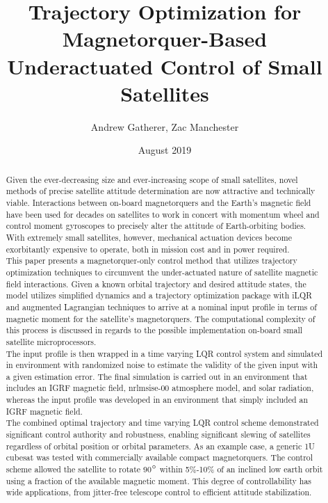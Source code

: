 \documentclass{article}
\begin{document}
\title{Trajectory Optimization for Magnetorquer-Based Underactuated Control of Small Satellites}
\author{Andrew Gatherer, Zac Manchester}
\date{August 2019}
\maketitle

\begin{abstract}
Given the ever-decreasing size and ever-increasing scope of small satellites, novel methods of precise satellite attitude determination are now attractive and technically viable. Interactions between on-board magnetorquers and the Earth's magnetic field have been used for decades on satellites to work in concert with momentum wheel and control moment gyroscopes to precisely alter the attitude of Earth-orbiting bodies. With extremely small satellites, however, mechanical actuation devices become exorbitantly expensive to operate, both in mission cost and in power required. \\
\indent This paper presents a magnetorquer-only control method that utilizes trajectory optimization techniques to circumvent the under-actuated nature of satellite magnetic field interactions. Given a known orbital trajectory and desired attitude states, the model utilizes simplified dynamics and a trajectory optimization package with iLQR and augmented Lagrangian techniques to arrive at a nominal input profile in terms of magnetic moment for the satellite's magnetorquers. The computational complexity of this process is discussed in regards to the possible implementation on-board small satellite microprocessors. \\
\indent The input profile is then wrapped in a time varying LQR control system and simulated in environment with randomized noise to estimate the validity of the given input with a given estimation error. The final simulation is carried out in an environment that includes an IGRF magnetic field, nrlmsise-00 atmosphere model, and solar radiation, whereas the input profile was developed in an environment that simply included an IGRF magnetic field.\\
\indent The combined optimal trajectory and time varying LQR control scheme demonstrated significant control authority and robustness, enabling significant slewing of satellites regardless of orbital position or orbital parameters. As an example case, a generic 1U cubesat was tested with commercially available compact magnetorquers. The control scheme allowed the satellite to rotate 90$\degree$ within 5$\%$-10$\%$ of an inclined low earth orbit using a fraction of the available magnetic moment. This degree of controllability has wide applications, from jitter-free telescope control to efficient attitude stabilization.  

\end{abstract}
\end{document}
